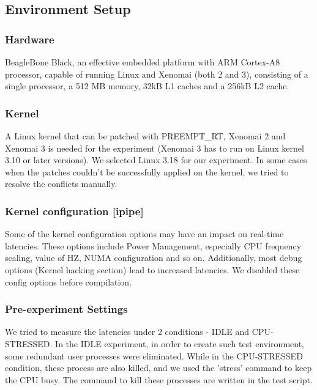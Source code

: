 \documentclass[10pt,a4paper]{article}
\begin{document}
\begin{multicols}{2}
\subsection{Environment Setup}

\subsubsection{Hardware}
BeagleBone Black, an effective embedded platform with ARM Cortex-A8 processor, capable of running Linux and Xenomai (both 2 and 3), consisting of a single processor, a 512 MB memory, 32kB L1 caches and a 256kB L2 cache.  

\subsubsection{Kernel}
A Linux kernel that can be patched with PREEMPT\_RT, Xenomai 2 and Xenomai 3 is needed for the experiment (Xenomai 3 has to run on Linux kernel 3.10 or later versions). We selected Linux 3.18 for our experiment. In some cases when the patches couldn't be successfully applied on the kernel, we tried to resolve the conflicts manually.
  
\subsubsection{Kernel configuration [ipipe]}
Some of the kernel conﬁguration options may have an impact on real-time latencies. These options include Power Management, especially CPU frequency scaling, value of HZ, NUMA conﬁguration and so on. Additionally, most debug options (Kernel hacking section) lead to increased latencies. We disabled these config options before compilation.

\subsubsection{Pre-experiment Settings}
We tried to measure the latencies under 2 conditions - IDLE and CPU-STRESSED. In the IDLE experiment, in order to create such test environment, some redundant user processes were eliminated. While in the CPU-STRESSED condition, these process are also killed, and we used the 'stress' command to keep the CPU busy. The command to kill these processes are written in the test script.


\end{multicols}
\end{document}
